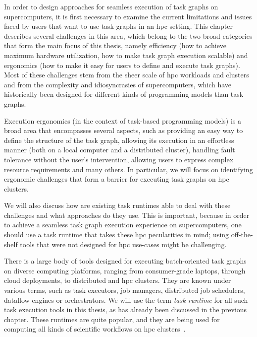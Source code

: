 In order to design approaches for seamless execution of task graphs on supercomputers, it is first
necessary to examine the current limitations and issues faced by users that want to use task graphs
in an \gls{hpc} setting. This chapter describes several challenges in this area, which
belong to the two broad categories that form the main focus of this thesis, namely efficiency (how
to achieve maximum hardware utilization, how to make task graph execution scalable) and ergonomics
(how to make it easy for users to define and execute task graphs). Most of these challenges stem
from the sheer scale of \gls{hpc} workloads and clusters and from the complexity and
idiosyncrasies of supercomputers, which have historically been designed for different kinds of
programming models than task graphs.

Execution ergonomics (in the context of task-based programming models) is a broad area that
encompasses several aspects, such as providing an easy way to define the structure of the task
graph, allowing its execution in an effortless manner (both on a local computer and a distributed
cluster), handling fault tolerance without the user's intervention, allowing users to express
complex resource requirements and many others. In particular, we will focus on identifying
ergonomic challenges that form a barrier for executing task graphs on \gls{hpc}
clusters.

We will also discuss how are existing task runtimes able to deal with these challenges and what
approaches do they use. This is important, because in order to achieve a seamless task graph
execution experience on supercomputers, one should use a task runtime that takes these
\gls{hpc} pecularities in mind; using off-the-shelf tools that were not designed for
\gls{hpc} use-cases might be challenging.

There is a large body of tools designed for executing batch-oriented task graphs on diverse
computing platforms, ranging from consumer-grade laptops, through cloud deployments, to distributed
and \gls{hpc} clusters. They are known under various terms, such as task executors,
job managers, distributed job schedulers, dataflow engines or orchestrators. We will use the term
\emph{task runtime} for all such task execution tools in this thesis, as has already been
discussed in the previous chapter. These runtimes are quite popular, and they are being used for
computing all kinds of scientific workflows on \gls{hpc}
clusters~\cite{hpc_tasks, hpc_tasks_2, hpc_tasks_3, pegasus}.

